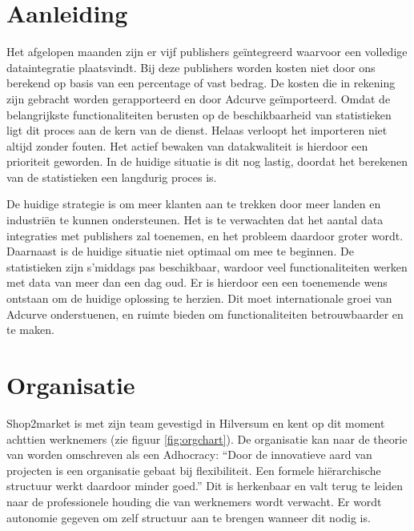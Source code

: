 \pagebreak

\section{Aanleiding} %

Het afgelopen maanden zijn er vijf publishers geïntegreerd waarvoor een volledige dataintegratie plaatsvindt. Bij deze publishers worden kosten niet door ons berekend op basis van een percentage of vast bedrag. De kosten die in rekening zijn gebracht worden gerapporteerd en door Adcurve geïmporteerd.
Omdat de belangrijkste functionaliteiten berusten op de beschikbaarheid van statistieken ligt dit proces aan de kern van de dienst. Helaas verloopt het importeren niet altijd zonder fouten. Het actief bewaken van datakwaliteit is hierdoor een prioriteit geworden. In de huidige situatie is dit nog lastig, doordat het berekenen van de statistieken een langdurig proces is.

De huidige strategie is om meer klanten aan te trekken door meer landen en industriën te kunnen ondersteunen. Het is te verwachten dat het aantal data integraties met publishers zal toenemen, en het probleem daardoor groter wordt. Daarnaast is de huidige situatie niet optimaal om mee te beginnen. De statistieken zijn s'middags pas beschikbaar, wardoor veel functionaliteiten werken met data van meer dan een dag oud. Er is hierdoor een een toenemende wens ontstaan om de huidige oplossing te herzien. Dit moet internationale groei van Adcurve onderstuenen, en ruimte bieden om functionaliteiten betrouwbaarder en te maken.

\section{Organisatie} %

Shop2market is met zijn team gevestigd in Hilversum en kent op dit moment achttien werknemers (zie figuur \ref{fig:orgchart}). De organisatie kan naar de theorie van
\autocite{mintzberg} worden omschreven als een Adhocracy: “Door de innovatieve aard van projecten is een organisatie gebaat bij flexibiliteit. Een formele hiërarchische structuur werkt daardoor minder goed.” Dit is herkenbaar en valt terug te leiden naar de professionele houding die van werknemers wordt verwacht. Er wordt autonomie gegeven om zelf structuur aan te brengen wanneer dit nodig is.

